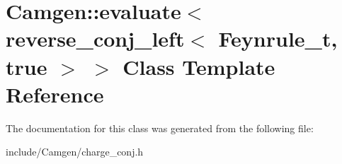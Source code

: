 \hypertarget{a00185}{}\section{Camgen\+:\+:evaluate$<$ reverse\+\_\+conj\+\_\+left$<$ Feynrule\+\_\+t, true $>$ $>$ Class Template Reference}
\label{a00185}


The documentation for this class was generated from the following file\+:\begin{DoxyCompactItemize}
\item 
include/\+Camgen/charge\+\_\+conj.\+h\end{DoxyCompactItemize}
